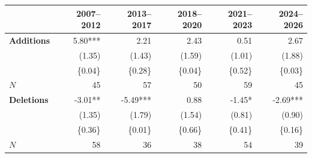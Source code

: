 \begin{tabular}{lrrrrr}
\toprule
 & 2007–2012 & 2013–2017 & 2018–2020 & 2021–2023 & 2024–2026 \\
\midrule
\textbf{Additions} & 5.80*** & 2.21 & 2.43 & 0.51 & 2.67 \\
 & (1.35) & (1.43) & (1.59) & (1.01) & (1.88) \\
 & \{0.04\} & \{0.28\} & \{0.04\} & \{0.52\} & \{0.03\} \\
$N$ & 45 & 57 & 50 & 59 & 45 \\
\addlinespace
\textbf{Deletions} & -3.01** & -5.49*** & 0.88 & -1.45* & -2.69*** \\
 & (1.35) & (1.79) & (1.54) & (0.81) & (0.90) \\
 & \{0.36\} & \{0.01\} & \{0.66\} & \{0.41\} & \{0.16\} \\
$N$ & 58 & 36 & 38 & 54 & 39 \\
\bottomrule
\end{tabular}
